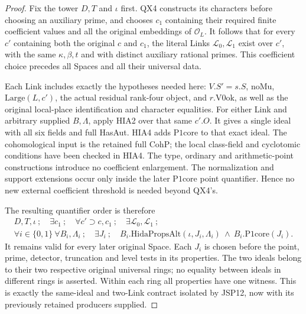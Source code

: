 \begin{proof}
Fix the tower \(D,T\) and \(\iota\) first.  QX4 constructs
its characters before choosing an auxiliary prime, and
chooses \(c_1\) containing their required finite coefficient
values and all the original embeddings of \(\mathcal O_L\).
It follows that for every \(c'\) containing both the original
\(c\) and \(c_1\), the literal Links
\(\mathcal L_0,\mathcal L_1\) exist over \(c'\), with
the same \(\kappa,\beta,t\) and with distinct auxiliary
rational primes.  This coefficient choice precedes all
Spaces and all their universal data.

Each Link includes exactly the hypotheses needed here:
\(V.S'=s.S\), \(\mathrm{noMu}\),
\(\mathrm{Large}(L,c')\), the actual residual rank-four
object, and \(r.\mathrm{V0ok}\), as well as the original
local-place identification and character equalities.
For either Link and arbitrary supplied \(B,\Lambda\),
apply HIA2 over that same \(c'.O\).  It gives a single
ideal with all six fields and full HasAut.  HIA4 adds
\(\mathrm{P1core}\) to that exact ideal.  The cohomological
input is the retained full \(\mathrm{CohP}\); the local
class-field and cyclotomic conditions have been checked
in HIA4.  The type, ordinary and arithmetic-point
constructions introduce no coefficient enlargement.
The normalization and support extensions occur only inside
the later \(\mathrm{P1core}\) point quantifier.  Hence no
new external coefficient threshold is needed beyond QX4's.

The resulting quantifier order is therefore
\[
 \begin{gathered}
 D,T,\iota\ ;\quad \exists c_1\ ;\quad
 \forall c'\supset c,c_1\ ;\quad
 \exists\mathcal L_0,\mathcal L_1\ ;\\
 \forall i\in\{0,1\}\ \forall B_i,\Lambda_i\ ;\quad
 \exists J_i\ ;\quad
 B_i.\mathrm{HidaPropsAlt}(\iota,J_i,\Lambda_i)
                    \ \wedge\ B_i.\mathrm{P1core}(J_i).
 \end{gathered}
 \tag{HIA.15}
\]
It remains valid for every later original Space.  Each
\(J_i\) is chosen before the point, prime, detector,
truncation and level tests in its properties.  The two
ideals belong to their two respective original universal
rings; no equality between ideals in different rings is
asserted.  Within each ring all properties have one witness.
This is exactly the same-ideal and two-Link contract isolated
by JSP12, now with its previously retained producers supplied.


\end{proof}
